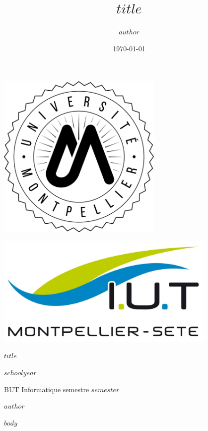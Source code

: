 \documentclass[11pt]{article}
\title{$title$}
\author{$author$}
\date{\today}
\begin{document}
\begin{titlepage}
    \centering
    \vspace*{2cm}

    \begin{minipage}{0.5\textwidth}
        \centering
        \includegraphics[width=0.6\textwidth]{ressources/logoUM.png} %
    \end{minipage}%
    \begin{minipage}{0.5\textwidth}
        \centering
        \includegraphics[width=0.8\textwidth]{ressources/logoIUT.png} %
    \end{minipage}

    \vspace*{4cm}
    \Huge\oswald\fontsize{26}{24}\color{titleColor}\bfseries $title$\par
    \vspace{2cm}
    \vfill
    \raggedleft
    {\Large\sans\bfseries\linespread{1.2}\fontsize{11}{24}\color{black}\selectfont $schoolyear$\par
    BUT Informatique semestre $semester$\par
    $author$\par}
\end{titlepage}

$body$
\end{document}
